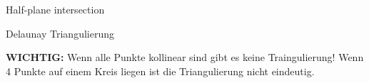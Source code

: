 
\begin{algorithm}{Half-plane intersection}
\end{algorithm}

\begin{algorithm}[optional]{Delaunay Triangulierung}
	\begin{methods}
	\end{methods}
	\textbf{WICHTIG:} Wenn alle Punkte kollinear sind gibt es keine Traingulierung! Wenn 4 Punkte auf einem Kreis liegen ist die Triangulierung nicht eindeutig.
\end{algorithm}

